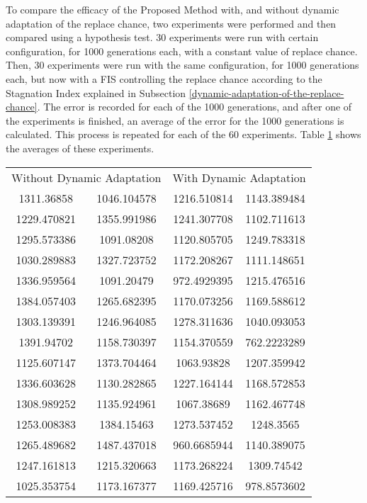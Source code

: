 \documentclass[12pt,journal,draftcls,onecolumn]{IEEEtran}
\begin{document}
To compare the efficacy of the Proposed Method with, and without dynamic adaptation of the replace chance, two experiments were performed and then compared using a hypothesis test. 30 experiments were run with certain configuration, for 1000 generations each, with a constant value of replace chance. Then, 30 experiments were run with the same configuration, for 1000 generations each, but now with a FIS controlling the replace chance according to the Stagnation Index explained in Subsection \ref{dynamic-adaptation-of-the-replace-chance}. The error is recorded for each of the 1000 generations, and after one of the experiments is finished, an average of the error for the 1000 generations is calculated. This process is repeated for each of the 60 experiments. Table \ref{dynamic-vs-non-dynamic-table} shows the averages of these experiments.

\begin{table}
    \label{dynamic-vs-non-dynamic-table}
    \begin{tabular}{ c c | c c}
        \multicolumn{2}{c}{Without Dynamic Adaptation} & \multicolumn{2}{c}{With Dynamic Adaptation} \\ 
         1311.36858  & 1046.104578 & 1216.510814 & 1143.389484 \\ 
         1229.470821 & 1355.991986 & 1241.307708 & 1102.711613 \\ 
         1295.573386 & 1091.08208  & 1120.805705 & 1249.783318 \\ 
         1030.289883 & 1327.723752 & 1172.208267 & 1111.148651 \\ 
         1336.959564 & 1091.20479  & 972.4929395 & 1215.476516 \\ 
         1384.057403 & 1265.682395 & 1170.073256 & 1169.588612 \\ 
         1303.139391 & 1246.964085 & 1278.311636 & 1040.093053 \\ 
         1391.94702  & 1158.730397 & 1154.370559 & 762.2223289 \\ 
         1125.607147 & 1373.704464 & 1063.93828  & 1207.359942 \\ 
         1336.603628 & 1130.282865 & 1227.164144 & 1168.572853 \\
         1308.989252 & 1135.924961 & 1067.38689  & 1162.467748 \\
         1253.008383 & 1384.15463  & 1273.537452 & 1248.3565   \\
         1265.489682 & 1487.437018 & 960.6685944 & 1140.389075 \\
         1247.161813 & 1215.320663 & 1173.268224 & 1309.74542  \\
         1025.353754 & 1173.167377 & 1169.425716 & 978.8573602 \\
    \end{tabular} 
\end{table}
\end{document}
